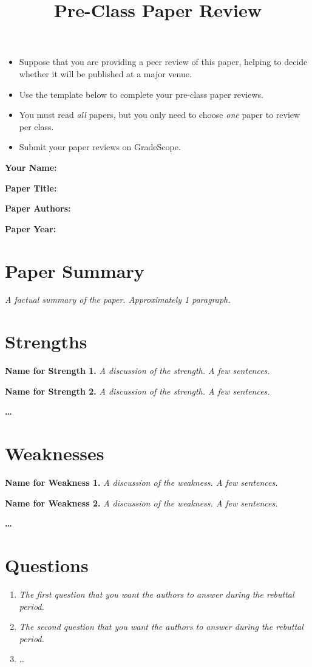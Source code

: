 \documentclass[11pt]{article}
\title{\vspace{-3em}\textbf{Pre-Class Paper Review}\vspace{-2em}}
\date{\vspace{-3em}}
\begin{document}
\maketitle
\thispagestyle{fancy}

\begin{instructionsbox}
\begin{itemize}
    \item Suppose that you are providing a peer review of this paper, helping to decide whether it will be published at a major venue.
    \item Use the template below to complete your pre-class paper reviews.
    \item You must read \emph{all} papers, but you only need to choose \emph{one} paper to review per class.
    \item Submit your paper reviews on GradeScope.
\end{itemize}
\end{instructionsbox}

\textbf{Your Name:} 

\textbf{Paper Title:}

\textbf{Paper Authors:}

\textbf{Paper Year:}

\hrulefill

\section*{Paper Summary}
\emph{A factual summary of the paper. Approximately 1 paragraph.}

\section*{Strengths}

\textbf{Name for Strength 1.} \emph{A discussion of the strength. A few sentences.}

\textbf{Name for Strength 2.} \emph{A discussion of the strength. A few sentences.}

\textbf{\dots}

\section*{Weaknesses}

\textbf{Name for Weakness 1.} \emph{A discussion of the weakness. A few sentences.}

\textbf{Name for Weakness 2.} \emph{A discussion of the weakness. A few sentences.}

\textbf{\dots}

\section*{Questions}

\begin{enumerate}
    \item \emph{The first question that you want the authors to answer during the rebuttal period.}
    \item \emph{The second question that you want the authors to answer during the rebuttal period.}
    \item \dots
\end{enumerate}
\end{document}
